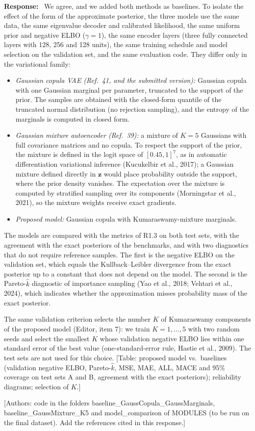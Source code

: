 \documentclass[11pt]{article}
\newenvironment{response}{\par\smallskip\noindent\color{resp}\textbf{Response:}\ }{\par}
\newcommand{\authornote}[1]{\textcolor{note}{\textsf{[Authors: #1]}}}
\newcommand{\tbd}[1]{\textcolor{note}{\textsf{[#1]}}}
\newcommand{\z}{\mathbf{z}}
\begin{document}
\begin{response}
We agree, and we added both methods as baselines. To isolate the effect of the form of the approximate posterior, the
three models use the same data, the same eigenvalue decoder and calibrated likelihood, the same uniform prior and
negative ELBO ($\gamma=1$), the same encoder layers (three fully connected layers with 128, 256 and 128 units), the same
training schedule and model selection on the validation set, and the same evaluation code. They differ only in the
variational family:
\begin{itemize}[leftmargin=*]
\item \emph{Gaussian copula VAE (Ref.~41, and the submitted version):} Gaussian copula with one Gaussian marginal per
parameter, truncated to the support of the prior. The samples are obtained with the closed-form quantile of the
truncated normal distribution (no rejection sampling), and the entropy of the marginals is computed in closed form.
\item \emph{Gaussian mixture autoencoder (Ref.~39):} a mixture of $K=5$ Gaussians with full covariance matrices and no
copula. To respect the support of the prior, the mixture is defined in the logit space of $[0.45,1]^7$, as in automatic
differentiation variational inference (Kucukelbir et al., 2017); a Gaussian mixture defined directly in $\z$ would place
probability outside the support, where the prior density vanishes. The expectation over the mixture is computed by
stratified sampling over its components (Morningstar et al., 2021), so the mixture weights receive exact gradients.
\item \emph{Proposed model:} Gaussian copula with Kumaraswamy-mixture marginals.
\end{itemize}
The models are compared with the metrics of R1.3 on both test sets, with the agreement with the exact posteriors of the
benchmarks, and with two diagnostics that do not require reference samples. The first is the negative ELBO on the
validation set, which equals the Kullback--Leibler divergence from the exact posterior up to a constant that does not
depend on the model. The second is the Pareto-$\hat{k}$ diagnostic of importance sampling (Yao et al., 2018; Vehtari
et al., 2024), which indicates whether the approximation misses probability mass of the exact posterior.

The same validation criterion selects the number $K$ of Kumaraswamy components of the proposed model (Editor, item 7):
we train $K=1,\dots,5$ with two random seeds and select the smallest $K$ whose validation negative ELBO lies within one
standard error of the best value (one-standard-error rule, Hastie et al., 2009). The test sets are not used for this
choice.
\tbd{Table: proposed model vs.\ baselines (validation negative ELBO, Pareto-$\hat{k}$, MSE, MAE, ALL, MACE and 95\%
coverage on test sets A and B, agreement with the exact posteriors); reliability diagrams; selection of $K$.}
\end{response}
\authornote{code in the folders baseline\_GaussCopula\_GaussMarginals, baseline\_GaussMixture\_K5 and
model\_comparison of MODULES (to be run on the final dataset). Add the references cited in this response.}
\end{document}
